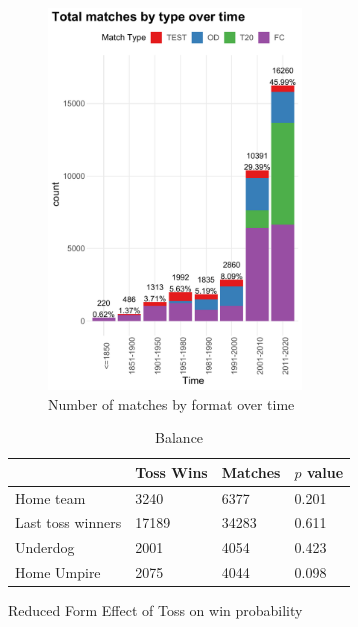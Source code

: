 \documentclass[11pt,  letterpaper]{article}
\begin{document}
\newpage



\clearpage


\begin{figure}[tbh]
  \centering
  \includegraphics[width=0.6\textwidth,keepaspectratio]{output/matchcounts.pdf}
  \caption{Number of matches by format over time}
  \label{fig:timeseries_decomp}
\end{figure}


\begin{table}[b!]\centering
\begin{tabular}{llll}
 & Toss Wins & Matches & $p$ value\\ \hline
Home team & 3240 & 6377 & 0.201\\
Last toss winners & 17189 & 34283 & 0.611\\
Underdog & 2001 & 4054 & 0.423\\
Home Umpire &  2075	& 4044	& 0.098 \\
\end{tabular}
\caption{Balance \label{table: balance}}
\end{table}



\begin{table}
\centering
\caption{Reduced Form Effect of Toss on win probability}

\label{table:reduced_form}
\end{table}
\end{document}
